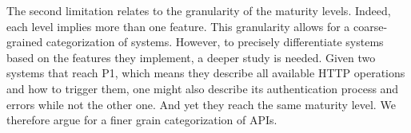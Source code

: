 The second limitation relates to the granularity of the maturity levels. Indeed, each level implies more than one feature. This granularity allows for a coarse-grained categorization of systems. 
However, to precisely differentiate systems based on the features they implement, a deeper study is needed. 
Given two systems that reach P1, which means they describe all available HTTP operations and how to trigger them, one might also describe its authentication process and errors while not the other one. 
And yet they reach the same maturity level. 
We therefore argue for a finer grain categorization of APIs.